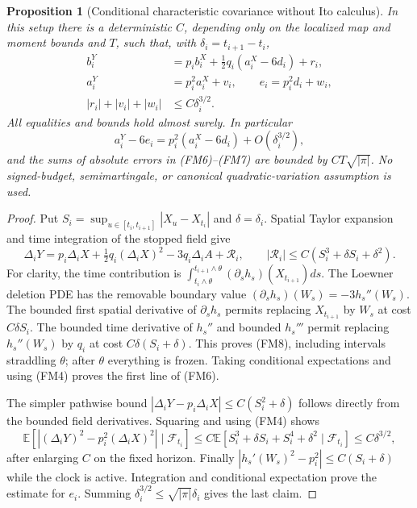 \documentclass[11pt]{article}
\newtheorem{proposition}[theorem]{Proposition}
\theoremstyle{definition}\newtheorem{definition}[theorem]{Definition}
\theoremstyle{remark}\newtheorem{remark}[theorem]{Remark}
\begin{document}
\begin{proposition}[Conditional characteristic covariance without Ito calculus]
\label{prop:finite-mesh-deletion-covariance}
In this setup there is a deterministic $C$, depending only on the
localized map and moment bounds and $T$, such that, with
$\delta_i=t_{i+1}-t_i$,
\[
 \begin{aligned}
 b_i^Y&=p_i b_i^X+\tfrac12q_i(a_i^X-6d_i)+r_i,\\
 a_i^Y&=p_i^2a_i^X+v_i,\qquad
 e_i=p_i^2d_i+w_i,\\
 |r_i|+|v_i|+|w_i|&\le C\delta_i^{3/2}.
 \end{aligned}
 \tag{FM6}
\]
All equalities and bounds hold almost surely. In particular
\[
 a_i^Y-6e_i=p_i^2(a_i^X-6d_i)+O(\delta_i^{3/2}),
 \tag{FM7}
\]
and the sums of absolute errors in (FM6)--(FM7) are bounded by
$CT\sqrt{|\pi|}$. No signed-budget, semimartingale, or canonical
quadratic-variation assumption is used.
\end{proposition}
\begin{proof}
Put $S_i=\sup_{u\in[t_i,t_{i+1}]}|X_u-X_{t_i}|$ and
$\delta=\delta_i$. Spatial Taylor expansion and time integration of
the stopped field give
\[
 \Delta_iY=p_i\Delta_iX+\tfrac12q_i(\Delta_iX)^2
                  -3q_i\Delta_iA+\mathcal R_i,
 \qquad
 |\mathcal R_i|\le C(S_i^3+\delta S_i+\delta^2).
 \tag{FM8}
\]
For clarity, the time contribution is
$\int_{t_i\wedge\theta}^{t_{i+1}\wedge\theta}
 (\partial_sh_s)(X_{t_{i+1}})ds$.
The Loewner deletion PDE has the removable boundary value
$(\partial_sh_s)(W_s)=-3h_s''(W_s)$.
The bounded first spatial derivative of $\partial_sh_s$ permits
replacing $X_{t_{i+1}}$ by $W_s$ at cost $C\delta S_i$.
The bounded time derivative of $h_s''$ and bounded $h_s'''$ permit
replacing $h_s''(W_s)$ by $q_i$ at cost
$C\delta(S_i+\delta)$. This proves (FM8), including intervals
straddling $\theta$; after $\theta$ everything is frozen.
Taking conditional expectations and using (FM4) proves the first
line of (FM6).

The simpler pathwise bound
$|\Delta_iY-p_i\Delta_iX|\le C(S_i^2+\delta)$
follows directly from the bounded field derivatives. Squaring and
using (FM4) shows
\[
 \mathbb E[| (\Delta_iY)^2-p_i^2(\Delta_iX)^2 |
                      \mid\mathcal F_{t_i}]
 \le C\mathbb E[S_i^3+\delta S_i+S_i^4+\delta^2
                      \mid\mathcal F_{t_i}]
 \le C\delta^{3/2},
\]
after enlarging $C$ on the fixed horizon. Finally
$|h_s'(W_s)^2-p_i^2|\le C(S_i+\delta)$ while the clock is active.
Integration and conditional expectation prove the estimate for $e_i$.
Summing $\delta_i^{3/2}\le\sqrt{|\pi|}\delta_i$ gives the last claim.
\end{proof}
\end{document}
